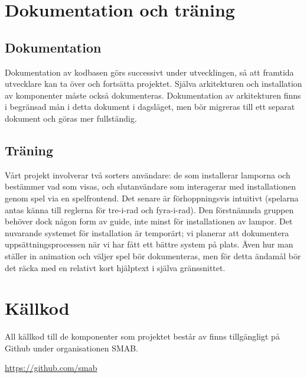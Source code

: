 \documentclass[a4paper,11pt]{article}
\begin{document}
\newpage
\section{Dokumentation och träning}

\subsection*{Dokumentation}
  Dokumentation av kodbasen görs successivt under utvecklingen, så att
  framtida utvecklare kan ta över och fortsätta projektet.  Själva
  arkitekturen och installation av komponenter måste också dokumenteras.
  Dokumentation av arkitekturen finns i begränsad mån i detta dokument i
  dagsläget, men bör migreras till ett separat dokument och göras mer
  fullständig.

\subsection*{Träning}
  Vårt projekt involverar två sorters användare: de som installerar lamporna
  och bestämmer vad som visas, och slutanvändare som interagerar med
  installationen genom spel via en spelfrontend.  Det senare är
  förhoppningsvis intuitivt (spelarna antas känna till reglerna för tre-i-rad
  och fyra-i-rad).  Den förstnämnda gruppen behöver dock någon form av guide,
  inte minst för installationen av lampor.  Det nuvarande systemet för
  installation är temporärt; vi planerar att dokumentera uppsättningsprocessen
  när vi har fått ett bättre system på plats.  Även hur man ställer in
  animation och väljer spel bör dokumenteras, men för detta ändamål bör det
  räcka med en relativt kort hjälptext i själva gränssnittet.


\section{Källkod}

  All källkod till de komponenter som projektet består av finns tillgängligt
  på Github under organisationen SMAB.

  \url{https://github.com/smab}
\end{document}
